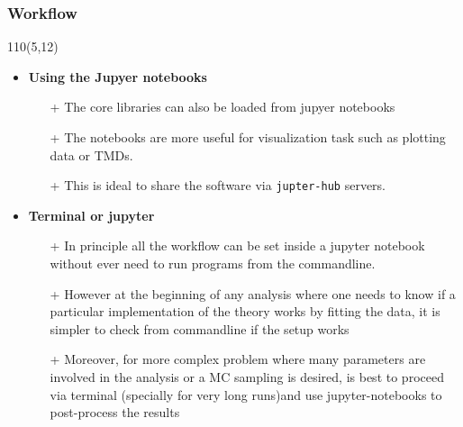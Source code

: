 \begin{frame}
\frametitle{\textbf{Workflow}}
\begin{textblock}{110}(5,12) 

\begin{itemize}
\item \textbf{Using the Jupyer notebooks}
      \begin{itemize}
      \item[+] The core libraries can also be loaded from jupyer notebooks
      \item[+] The notebooks are more useful for visualization task
               such as plotting data or TMDs. 
      \item[+] This is ideal to share the software via \texttt{jupter-hub}
               servers. 
      \end{itemize}

\item \textbf{Terminal or jupyter }
      \begin{itemize}
      \item[+] In principle all the workflow can be set inside a
               jupyter notebook without ever need to run programs 
               from the commandline. 
      \item[+] However at the beginning of any analysis where one
               needs to know if a particular implementation of the
               theory works by fitting the data, it is simpler to check  
               from commandline if the setup works
      \item[+] Moreover, for more complex problem where many parameters 
               are involved in the analysis or a MC sampling is
               desired, is best to proceed via terminal (specially for
               very long runs)and use  jupyter-notebooks to post-process the results
      \end{itemize}
\end{itemize}

\end{textblock}
\end{frame}


